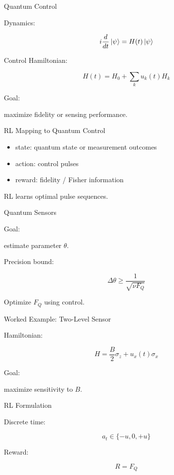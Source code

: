 \documentclass{beamer}
\begin{document}
\begin{frame}{Quantum Control}

  Dynamics:

  \[
  i \frac{d}{dt}\ket{\psi} = H(t)\ket{\psi}
  \]

  Control Hamiltonian:

  \[
  H(t)=H_0 + \sum_k u_k(t) H_k
  \]

  Goal:

  maximize fidelity or sensing performance.

\end{frame}

\begin{frame}{RL Mapping to Quantum Control}

  \begin{itemize}
  \item state: quantum state or measurement outcomes
  \item action: control pulses
  \item reward: fidelity / Fisher information
  \end{itemize}

  RL learns optimal pulse sequences.

\end{frame}

\begin{frame}{Quantum Sensors}

  Goal:

  estimate parameter $\theta$.

  Precision bound:

  \[
  \Delta \theta \ge \frac{1}{\sqrt{\nu F_Q}}
  \]

  Optimize $F_Q$ using control.

\end{frame}

\begin{frame}{Worked Example: Two-Level Sensor}

  Hamiltonian:

  \[
  H = \frac{B}{2}\sigma_z + u_x(t)\sigma_x
  \]

  Goal:

  maximize sensitivity to $B$.

\end{frame}

\begin{frame}{RL Formulation}

  Discrete time:

  \[
  a_t \in \{-u,0,+u\}
  \]

  Reward:

  \[
  R = F_Q
  \]

\end{frame}
\end{document}
